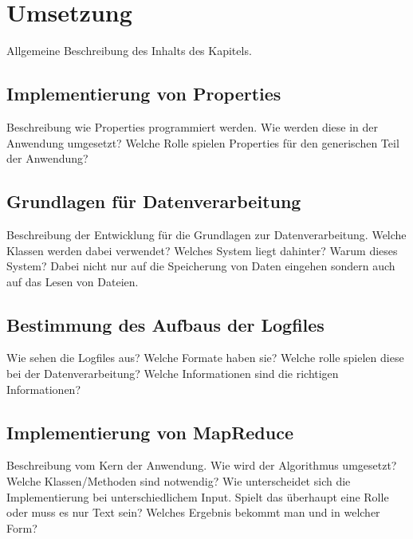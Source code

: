
\chapter{Umsetzung}\label{cha:Umsetzung}
Allgemeine Beschreibung des Inhalts des Kapitels.

\section{Implementierung von Properties}
Beschreibung wie Properties programmiert werden. Wie werden diese in der Anwendung umgesetzt? Welche Rolle spielen Properties für den generischen Teil der Anwendung?

\section{Grundlagen für Datenverarbeitung}
Beschreibung der Entwicklung für die Grundlagen zur Datenverarbeitung. Welche Klassen werden dabei verwendet? Welches System liegt dahinter? Warum dieses System? Dabei nicht nur auf die Speicherung von Daten eingehen sondern auch auf das Lesen von Dateien.

\section{Bestimmung des Aufbaus der Logfiles}
Wie sehen die Logfiles aus? Welche Formate haben sie? Welche rolle spielen diese bei der Datenverarbeitung? Welche Informationen sind die richtigen Informationen?

\section{Implementierung von MapReduce}
Beschreibung vom Kern der Anwendung. Wie wird der Algorithmus umgesetzt? Welche Klassen/Methoden sind notwendig? Wie unterscheidet sich die Implementierung bei unterschiedlichem Input. Spielt das überhaupt eine Rolle oder muss es nur Text sein? Welches Ergebnis bekommt man und in welcher Form?
